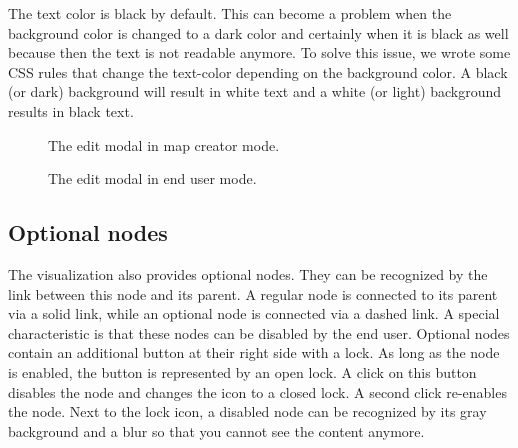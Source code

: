 The text color is black by default. This can become a problem when the background color is changed to a dark color and certainly when it is black as well because then the text is not readable anymore. To solve this issue, we wrote some CSS rules that change the text-color depending on the background color. A black (or dark) background will result in white text and a white (or light) background results in black text.

\begin{figure}[H]
	\centering
	\caption{The edit modal in map creator mode.}
	\label{fig:gm-editmodal-mapcreator}
\end{figure}

\begin{figure}[H]
	\centering
	\caption{The edit modal in end user mode.}
	\label{fig:gm-editmodal-enduser}
\end{figure}


\subsection{Optional nodes}\label{sec:optional-nodes}
The visualization also provides optional nodes. They can be recognized by the link between this node and its parent. A regular node is connected to its parent via a solid link, while an optional node is connected via a dashed link. A special characteristic is that these nodes can be disabled by the end user. Optional nodes contain an additional button at their right side with a lock. As long as the node is enabled, the button is represented by an open lock. A click on this button disables the node and changes the icon to a closed lock. A second click re-enables the node. Next to the lock icon, a disabled node can be recognized by its gray background and a blur so that you cannot see the content anymore.














